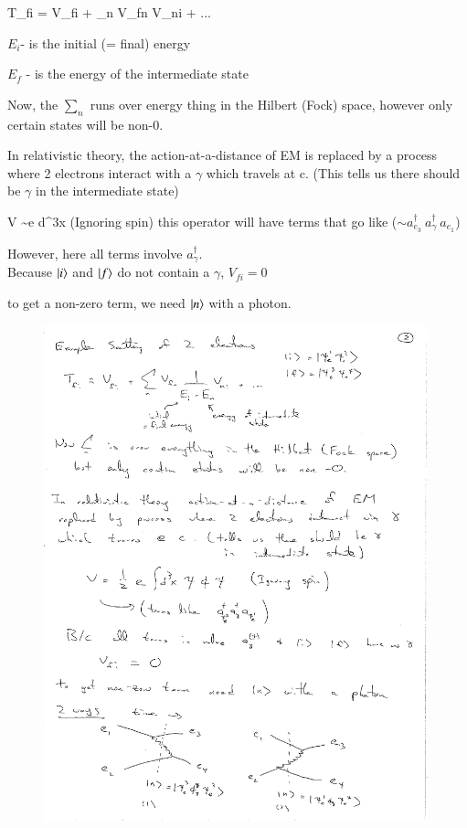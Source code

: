 {\be
T_{fi} = V_{fi} + \sum_n V_{fn}  V_{ni} + ...
\ee

\bi
\item[-] $E_i$- is the initial (= final) energy
\item[-] $E_f$ - is the energy of the intermediate state
\ei

Now, the $\sum_n$ runs over energy thing in the Hilbert (Fock) space, however only certain states will be non-0.

In relativistic theory, the action-at-a-distance of EM is replaced by a process where 2 electrons interact with a $\gamma$ which travels at c. 
(This tells us there should be $\gamma$ in the intermediate state)


\be
V \sim e \int d^3x \psi \phi \psi  \hspace*{0.3in} \textrm{(Ignoring spin)}
\ee
this operator will have terms that go like ($\sim a_{e_3}^\dagger\ a_{\gamma}^\dagger\ a_{e_1}$)


However, here all terms involve $a_{\gamma}^\dagger$.\\
Because $\ket{i}$ and $\ket{f}$ do not contain a $\gamma$, $  V_{fi} = 0$

to get a non-zero term, we need $\ket{n}$ with a photon. 
\begin{figure}[h]
\centering
\includegraphics[width=0.99\textwidth]{./eeScattering.pdf}
\end{figure}





}


